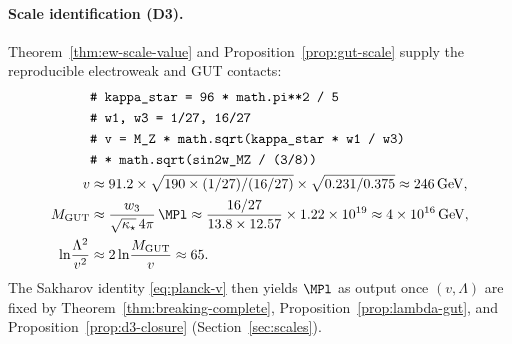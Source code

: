 \paragraph{Scale identification (D3).}
Theorem~\ref{thm:ew-scale-value} and Proposition~\ref{prop:gut-scale} supply
the reproducible electroweak and GUT contacts:
\begin{equation}\label{eq:workbook-planck}
\begin{aligned}
  &\texttt{\# kappa\_star = 96 * math.pi**2 / 5}\\
  &\texttt{\# w1, w3 = 1/27, 16/27}\\
  &\texttt{\# v = M\_Z * math.sqrt(kappa\_star * w1 / w3)}\\
  &\texttt{\#      * math.sqrt(sin2w\_MZ / (3/8))}\\
  v
  &\approx 91.2\times\sqrt{190\times(1/27)/(16/27)}\times\sqrt{0.231/0.375}
  \approx 246\,\mathrm{GeV},\\
  M_{\mathrm{GUT}}
  &\approx \frac{w_3}{\sqrt{\kappa_\star}\,4\pi}\,\MPl
  \approx \frac{16/27}{13.8\times 12.57}\times 1.22\times 10^{19}
  \approx 4\times 10^{16}\,\mathrm{GeV},\\
  \ln\!\frac{\Lambda^2}{v^2}
  &\approx 2\ln\!\frac{M_{\mathrm{GUT}}}{v}
  \approx 65.
\end{aligned}
\end{equation}
The Sakharov identity \eqref{eq:planck-v} then yields $\MPl$ as output once
$(v,\Lambda)$ are fixed by Theorem~\ref{thm:breaking-complete},
Proposition~\ref{prop:lambda-gut}, and Proposition~\ref{prop:d3-closure}
(Section~\ref{sec:scales}).

